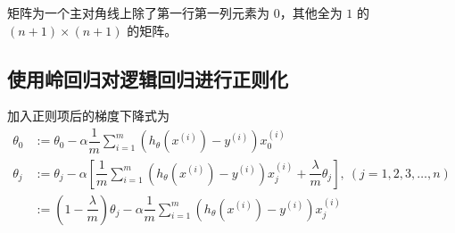 矩阵为一个主对角线上除了第一行第一列元素为 $0$，其他全为 $1$ 的 $(n + 1) \times (n + 1)$ 的矩阵。

\subsection{使用岭回归对逻辑回归进行正则化}
加入正则项后的梯度下降式为
\begin{equation}
    \begin{aligned}
        \theta_0 &:= \theta_0 - \alpha \dfrac 1m\sum\limits_{i = 1}^m\left(h_\theta\left(x^{(i)}\right) - y^{(i)}\right)x_0^{(i)} \\
        \theta_j &:= \theta_j - \alpha \left[\dfrac 1m\sum\limits_{i = 1}^m\left(h_\theta\left(x^{(i)}\right) 
        - y^{(i)}\right)x_j^{(i)} + \dfrac \lambda m \theta_j\right],\ (j = 1, 2, 3, \dots, n) \\
        &:= \left(1 - \dfrac\lambda m\right)\theta_j - \alpha \dfrac 1m\sum\limits_{i = 1}^m\left(h_\theta\left(x^{(i)}\right) 
        - y^{(i)}\right)x_j^{(i)}
    \end{aligned}
\end{equation}